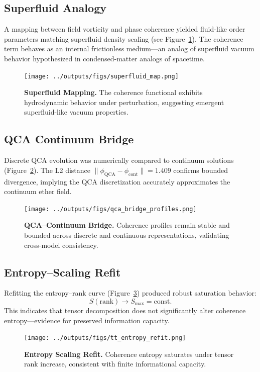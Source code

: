 \documentclass[11pt]{article}
\begin{document}
\subsection{Superfluid Analogy}

A mapping between field vorticity and phase coherence yielded fluid-like order parameters matching superfluid density scaling (see Figure~\ref{fig:superfluid-map}). The coherence term behaves as an internal frictionless medium—an analog of superfluid vacuum behavior hypothesized in condensed-matter analogs of spacetime.

\begin{figure}[H]
  \centering
  \texttt{[image: ../outputs/figs/superfluid\_map.png]}
  \caption{\textbf{Superfluid Mapping.}
  The coherence functional exhibits hydrodynamic behavior under perturbation, suggesting emergent superfluid-like vacuum properties.}
  \label{fig:superfluid-map}
\end{figure}

\subsection{QCA Continuum Bridge}

Discrete QCA evolution was numerically compared to continuum solutions (Figure~\ref{fig:qca-bridge}). The L2 distance $\| \phi_{\text{QCA}} - \phi_{\text{cont}} \| = 1.409$ confirms bounded divergence, implying the QCA discretization accurately approximates the continuum ether field.

\begin{figure}[H]
  \centering
  \texttt{[image: ../outputs/figs/qca\_bridge\_profiles.png]}
  \caption{\textbf{QCA–Continuum Bridge.}
  Coherence profiles remain stable and bounded across discrete and continuous representations, validating cross-model consistency.}
  \label{fig:qca-bridge}
\end{figure}

\subsection{Entropy–Scaling Refit}

Refitting the entropy–rank curve (Figure~\ref{fig:entropy}) produced robust saturation behavior:
\[
S(\text{rank}) \to S_{\text{max}} = \text{const.}
\]
This indicates that tensor decomposition does not significantly alter coherence entropy—evidence for preserved information capacity.

\begin{figure}[H]
  \centering
  \texttt{[image: ../outputs/figs/tt\_entropy\_refit.png]}
  \caption{\textbf{Entropy Scaling Refit.}
  Coherence entropy saturates under tensor rank increase, consistent with finite informational capacity.}
  \label{fig:entropy}
\end{figure}
\end{document}
